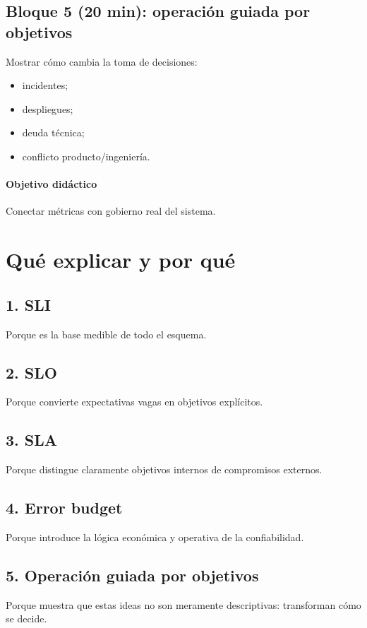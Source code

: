 \documentclass[variant=docente,cover=institutional,mode=screen]{ua-engineering-v6-article}
\begin{document}
\subsection*{Bloque 5 (20 min): operación guiada por objetivos}
Mostrar cómo cambia la toma de decisiones:
\begin{itemize}
\item incidentes;
\item despliegues;
\item deuda técnica;
\item conflicto producto/ingeniería.
\end{itemize}

\paragraph{Objetivo didáctico}
Conectar métricas con gobierno real del sistema.

\section{Qué explicar y por qué}

\subsection*{1. SLI}
Porque es la base medible de todo el esquema.

\subsection*{2. SLO}
Porque convierte expectativas vagas en objetivos explícitos.

\subsection*{3. SLA}
Porque distingue claramente objetivos internos de compromisos externos.

\subsection*{4. Error budget}
Porque introduce la lógica económica y operativa de la confiabilidad.

\subsection*{5. Operación guiada por objetivos}
Porque muestra que estas ideas no son meramente descriptivas: transforman cómo se decide.
\end{document}
